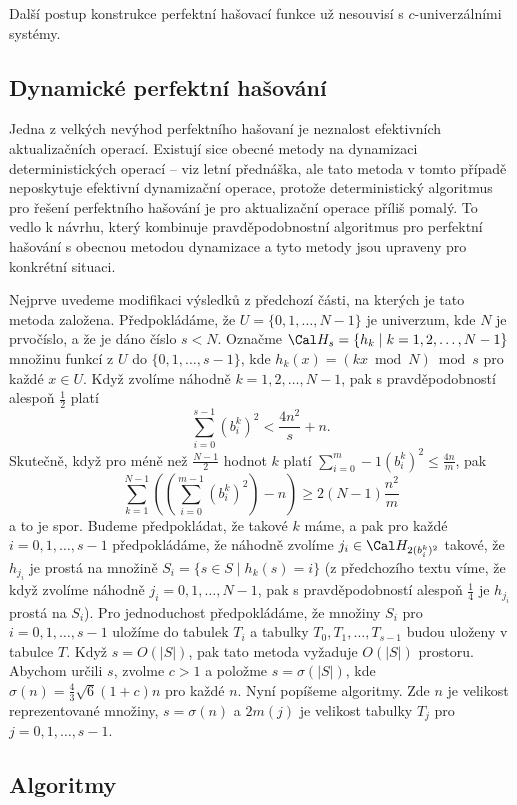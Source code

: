 \documentclass[a4paper,12pt]{article}
\begin{document}
Další postup konstrukce perfektní hašovací funkce už 
nesouvisí s $c$-univerzálními systémy. 

\subsection{
Dynamické perfektní hašování
}

Jedna z velkých nevýhod perfektního hašovaní je 
neznalost efektivních aktualizačních ope\-rací. Existují sice 
obecné meto\-dy na dynamizaci deterministických operací -- viz 
letní přednáš\-ka, ale tato metoda v tomto případě neposkytuje 
efektivní dynamizační operace, protože deterministický 
algoritmus pro ře\-še\-ní perfektního hašování je pro 
aktualizační ope\-race příliš pomalý. To vedlo k návrhu, 
který kombinuje pravděpodobnostní algoritmus pro perfektní 
hašování s obecnou metodou dynami\-za\-ce a tyto metody jsou 
upraveny pro konkrétní situaci. 

Nejprve uvedeme modifikaci výsledků z 
předchozí části, na kterých je tato metoda založena.
Předpokládáme, že $U=\{0,1,\dots,N-1\}$ je univerzum, kde $
N$ je 
prvočíslo, a že je dáno číslo $s<N$. Označme 
$\Cal H_s=\{h_k\mid k=1,2,\dots,N-1\}$ množinu funkcí z $U$ do 
$\{0,1,\dots,s-1\}$, kde $h_k(x)=(kx\bmod N)\bmod s$ pro každé $
x\in U$. 
Když zvolíme náhodně $k=1,2,\dots,N-1$, pak s pravděpodobností 
ales\-poň $\frac 12$ platí 
$$\sum_{i=0}^{s-1}(b_i^k)^2<\frac {4n^2}s+n.$$
Skutečně, když pro méně než $\frac{N-1}2$ hodnot $k$ platí $\sum_{i=0}^m-1(b^k_i)^2\le\frac{4n}m$, pak 
$$\sum_{k=1}^{N-1}\left((\sum_{i=0}^{m-1}(b^k_i)^2)-n\right)\ge2(N-1)\frac{n^2}m$$ 
a to je spor. Budeme předpokládat, 
že takové $k$ máme, a pak pro každé $i=0,1,\dots,s-1$ 
předpokládáme, že náhodně zvolíme $j_i\in \Cal H_{
2(b_i^k)^2}$ takové, že 
$h_{j_i}$ je prostá na množině $S_i=\{s\in S\mid h_k(s)=i
\}$ (z předchozího textu víme, že když zvolíme náhodně 
$j_i=0,1,\dots,N-1$, pak s pravděpodobností ales\-poň $\frac 
14$ je $h_{j_i}$ prostá na $S_i$). Pro jednoduchost předpokládáme, že množiny $
S_i$ 
pro $i=0,1,\dots,s-1$ uložíme do tabulek $T_i$ a tabulky 
$T_0,T_1,\dots,T_{s-1}$ budou uloženy v tabulce $T$. Když $
s=O(|S|)$, 
pak tato metoda vyžaduje $O(|S|)$ prostoru. Abychom určili $
s$, 
zvolme $c>1$ a položme $s=\sigma (|S|)$, kde $\sigma (n)=\frac 
43\sqrt 6(1+c)n$ pro 
každé $n$. Nyní popíšeme algoritmy. Zde $n$ je velikost reprezentované množiny, $s=\sigma(n)$ a $2m(j)$ je velikost tabulky $T_j$ pro $j=0,1,\dots,s-1$.

\subsection{
Algoritmy
}
\end{document}
